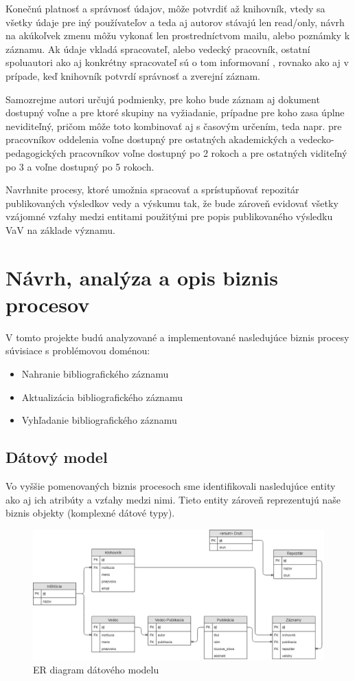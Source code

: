 \documentclass[10pt,oneside,slovak,a4paper]{article}
\begin{document}
Konečnú platnosť a správnosť údajov, môže potvrdiť až knihovník, vtedy sa všetky údaje pre iný používateľov a teda aj autorov stávajú len read/only, návrh na akúkoľvek zmenu môžu vykonať len prostredníctvom mailu, alebo poznámky k záznamu. Ak údaje vkladá spracovateľ, alebo vedecký pracovník, ostatní spoluautori ako aj konkrétny spracovateľ sú o tom informovaní , rovnako ako aj v prípade, keď knihovník potvrdí správnosť a zverejní záznam. 

Samozrejme autori určujú podmienky, pre koho bude záznam aj dokument dostupný voľne a pre ktoré skupiny na vyžiadanie, prípadne pre koho zasa úplne neviditeľný, pričom môže toto kombinovať aj s časovým určením, teda napr. pre pracovníkov oddelenia voľne dostupný pre ostatných akademických a vedecko-pedagogických pracovníkov voľne dostupný po 2 rokoch a pre ostatných viditeľný po 3 a voľne dostupný po 5 rokoch.

Navrhnite procesy, ktoré umožnia spracovať a sprístupňovať repozitár publikovaných výsledkov vedy a výskumu tak, že bude zároveň evidovať všetky vzájomné vzťahy medzi entitami použitými pre popis publikovaného výsledku VaV na základe významu.

\newpage

\section{Návrh, analýza a opis biznis procesov}

V tomto projekte budú analyzované a implementované nasledujúce biznis procesy súvisiace s problémovou doménou:

\begin{itemize}
\item Nahranie bibliografického záznamu
\item Aktualizácia bibliografického záznamu
\item Vyhľadanie bibliografického záznamu
\end{itemize}

\subsection{Dátový model}

Vo vyššie pomenovaných biznis procesoch sme identifikovali nasledujúce entity ako aj ich atribúty a vzťahy medzi nimi. Tieto entity zároveň reprezentujú naše biznis objekty (komplexné dátové typy).

\begin{figure}[h]
\label{datamodel}
\centering
\includegraphics[scale=0.4]{datovymodel.png} 
\caption{ER diagram dátového modelu}
\end{figure}
\end{document}
